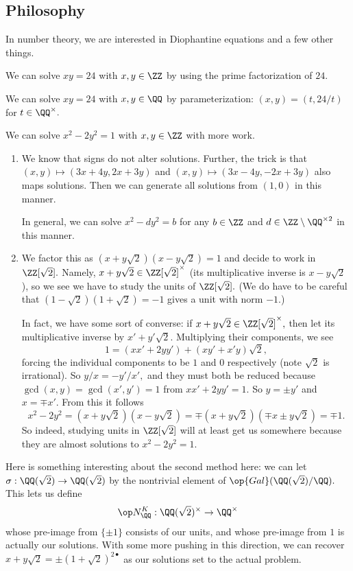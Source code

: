 \documentclass[../notes.tex]{subfiles}
\begin{document}
\subsection{Philosophy}
In number theory, we are interested in Diophantine equations and a few other things.
\begin{ex}
    We can solve $xy=24$ with $x,y\in\ZZ$ by using the prime factorization of $24.$
\end{ex}
\begin{ex}
    We can solve $xy=24$ with $x,y\in\QQ$ by parameterization: $(x,y)=(t,24/t)$ for $t\in\QQ^\times.$
\end{ex}
\begin{ex}
    We can solve $x^2-2y^2=1$ with $x,y\in\ZZ$ with more work.
    \begin{enumerate}
        \item We know that signs do not alter solutions. Further, the trick is that $(x,y)\mapsto(3x+4y,2x+3y)$ and $(x,y)\mapsto(3x-4y,-2x+3y)$ also maps solutions. Then we can generate all solutions from $(1,0)$ in this manner.
        
        In general, we can solve $x^2-dy^2=b$ for any $b\in\ZZ$ and $d\in\ZZ\setminus\QQ^{\times2}$ in this manner.
        \item We factor this as $(x+y\sqrt2)(x-y\sqrt2)=1$ and decide to work in $\ZZ[\sqrt2].$ Namely, $x+y\sqrt2\in\ZZ[\sqrt2]^\times$ (its multiplicative inverse is $x-y\sqrt2$), so we see we have to study the units of $\ZZ[\sqrt2].$ (We do have to be careful that $(1-\sqrt2)(1+\sqrt2)=-1$ gives a unit with norm $-1.$)
        
        In fact, we have some sort of converse: if $x+y\sqrt2\in\ZZ[\sqrt2]^\times,$ then let its multiplicative inverse by $x'+y'\sqrt2.$ Multiplying their components, we see
        \[1=(xx'+2yy')+(xy'+x'y)\sqrt2,\]
        forcing the individual components to be $1$ and $0$ respectively (note $\sqrt2$ is irrational). So $y/x=-y'/x',$ and they must both be reduced because $\gcd(x,y)=\gcd(x',y')=1$ from $xx'+2yy'=1.$ So $y=\pm y'$ and $x=\mp x'.$ From this it follows
        \[x^2-2y^2=(x+y\sqrt2)(x-y\sqrt2)=\mp(x+y\sqrt2)(\mp x\pm y\sqrt2)=\mp1.\]
        So indeed, studying units in $\ZZ[\sqrt2]$ will at least get us somewhere because they are almost solutions to $x^2-2y^2=1.$
    \end{enumerate}
\end{ex}
Here is something interesting about the second method here: we can let $\sigma:\QQ(\sqrt2)\to\QQ(\sqrt2)$ by the nontrivial element of $\op{Gal}(\QQ(\sqrt2)/\QQ).$ This lets us define
\[\op N_\QQ^K:\QQ(\sqrt2)^\times\to\QQ^\times\]
whose pre-image from $\{\pm1\}$ consists of our units, and whose pre-image from $1$ is actually our solutions. With some more pushing in this direction, we can recover $x+y\sqrt2=\pm(1+\sqrt2)^{2\bullet}$ as our solutions set to the actual problem.
\end{document}
